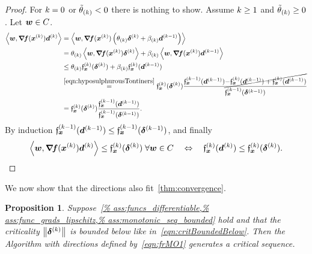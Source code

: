 \documentclass{article}
\theoremstyle{plain}
\newtheorem{proposition}[theorem]{Proposition}
\theoremstyle{definition}
\begin{document}
\begin{proof}
	For $k=0$ or $\tilde\theta_{(k)} < 0$ there is nothing
	to show.
	Assume $k \geq 1$ and $\tilde\theta_{(k)} \geq 0$.
	Let $\bm{w}\in C$.
	\begin{align*}
		\left\langle 
			\bm{w}
		, 
			\bm{\nabla}\!\bm{f}(\bm{x}^{(k)})
			\bm{d}^{(k)}
		 \right\rangle
		&=
		\left\langle \bm{w}, 
			\bm{\nabla}\!\bm{f}(\bm{x}^{(k)})
			\left(\theta_{(k)}\bm{\delta}^{(k)} + \beta_{(k)} \bm{d}^{(k-1)}\right)
		 \right\rangle
		\\
		&= 
		\theta_{(k)}\left\langle \bm{w}, \bm{\nabla}\!\bm{f}(\bm{x}^{(k)})\bm{\delta}^{(k)} \right\rangle
		+
		\beta_{(k)}\left\langle \bm{w}, \bm{\nabla}\!\bm{f}(\bm{x}^{(k)})\bm{d}^{(k-1)} \right\rangle
		\\
		&\leq
		\theta_{(k)}\mathfrak{f}_{\bm{x}}^{(k)}(\bm{\delta}^{(k)})
		+
		\beta_{(k)}\mathfrak{f}_{\bm{x}}^{(k)}(\bm{d}^{(k-1)})
		\\
		&\stackrel{\eqref{eqn:hyposulphurousTontiners}}=
		\mathfrak{f}_{\bm{x}}^{(k)}(\bm{\delta}^{(k)})
		\frac{
			\mathfrak{f}_{\bm{x}}^{(k-1)}(\bm{d}^{(k-1)})
			\cancel{
			-\mathfrak{f}_{\bm{x}}^{(k)}(\bm{d}^{(k-1)})
			+\mathfrak{f}_{\bm{x}}^{(k)}(\bm{d}^{(k-1)})
			}
		}{\mathfrak{f}_{\bm{x}}^{(k-1)}(\bm{\delta}^{(k-1)})}
		\\
		&=
		\mathfrak{f}_{\bm{x}}^{(k)}(\bm{\delta}^{(k)})
		\frac{\mathfrak{f}_{\bm{x}}^{(k-1)}(\bm{d}^{(k-1)})}{\mathfrak{f}_{\bm{x}}^{(k-1)}(\bm{\delta}^{(k-1)})}
		.
	\end{align*}
	By induction $\mathfrak{f}_{\bm{x}}^{(k-1)}(\bm{d}^{(k-1)}) \leq \mathfrak{f}_{\bm{x}}^{(k-1)}(\bm{\delta}^{(k-1)})$,
	and finally
	$$
	\left\langle 
		\bm{w}
		, 
			\bm{\nabla}\!\bm{f}(\bm{x}^{(k)})
			\bm{d}^{(k)}
		 \right\rangle
	\leq
	\mathfrak{f}_{\bm{x}}^{(k)}(\bm{\delta}^{(k)})
	\;\forall \bm{w}\in C
	\quad\Leftrightarrow\quad
	\mathfrak{f}_{\bm{x}}^{(k)}(\bm{d}^{(k)}) \leq \mathfrak{f}_{\bm{x}}^{(k)}(\bm{\delta}^{(k)}).
	$$
\end{proof}

We now show that the directions also fit~\cref{thm:convergence}.
\begin{proposition}%
	\label{thm:frMO1convergence}
	Suppose~\cref{%
	ass:funcs_differentiable,%
	ass:func_grads_lipschitz,%
	ass:monotonic_seq_bounded}
	hold and that the criticality $\left\|\bm{\delta}^{(k)}\right\|$ is 
	bounded below like in~\eqref{eqn:critBoundedBelow}.
	Then the Algorithm with directions defined
	by~\eqref{eqn:frMO1} generates a critical sequence.
\end{proposition}
\end{document}
